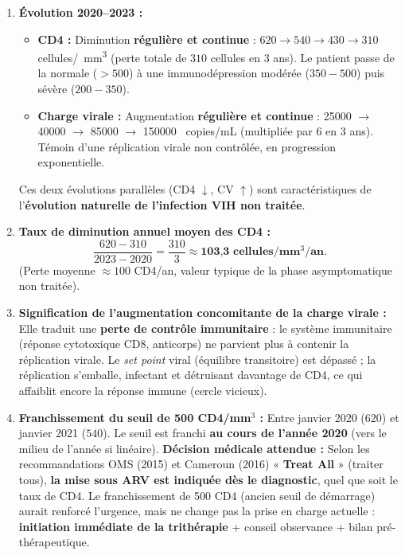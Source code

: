 \documentclass[11pt]{article}
\begin{document}
\begin{corrige}
\begin{enumerate}
\item \textbf{Évolution 2020--2023 :}
\begin{itemize}
\item \textbf{CD4 :} Diminution \textbf{régulière et continue} : $620 \to 540 \to 430 \to 310$ cellules/\SI{}{mm^3} (perte totale de $310$ cellules en 3 ans). Le patient passe de la normale ($>500$) à une immunodépression modérée ($350-500$) puis sévère ($200-350$).
\item \textbf{Charge virale :} Augmentation \textbf{régulière et continue} : \num{25000} $\to$ \num{40000} $\to$ \num{85000} $\to$ \num{150000} \SI{}{copies/mL} (multipliée par 6 en 3 ans). Témoin d'une réplication virale non contrôlée, en progression exponentielle.
\end{itemize}
Ces deux évolutions parallèles (CD4 $\downarrow$, CV $\uparrow$) sont caractéristiques de l'\textbf{évolution naturelle de l'infection VIH non traitée}.
\item \textbf{Taux de diminution annuel moyen des CD4 :}
\[
\frac{620 - 310}{2023 - 2020} = \frac{310}{3} \approx \textbf{103,3 cellules/mm$^3$/an}.
\]
(Perte moyenne $\approx 100$ CD4/an, valeur typique de la phase asymptomatique non traitée).
\item \textbf{Signification de l'augmentation concomitante de la charge virale :} Elle traduit une \textbf{perte de contrôle immunitaire} : le système immunitaire (réponse cytotoxique CD8, anticorps) ne parvient plus à contenir la réplication virale. Le \emph{set point} viral (équilibre transitoire) est dépassé ; la réplication s'emballe, infectant et détruisant davantage de CD4, ce qui affaiblit encore la réponse immune (cercle vicieux).
\item \textbf{Franchissement du seuil de 500 CD4/mm$^3$ :} Entre janvier 2020 ($620$) et janvier 2021 ($540$). Le seuil est franchi \textbf{au cours de l'année 2020} (vers le milieu de l'année si linéaire).
\textbf{Décision médicale attendue :} Selon les recommandations OMS (2015) et Cameroun (2016) « \textbf{Treat All} » (traiter tous), \textbf{la mise sous ARV est indiquée dès le diagnostic}, quel que soit le taux de CD4. Le franchissement de 500 CD4 (ancien seuil de démarrage) aurait renforcé l'urgence, mais ne change pas la prise en charge actuelle : \textbf{initiation immédiate de la trithérapie} + conseil observance + bilan pré-thérapeutique.
\end{enumerate}
\end{corrige}
\end{document}
